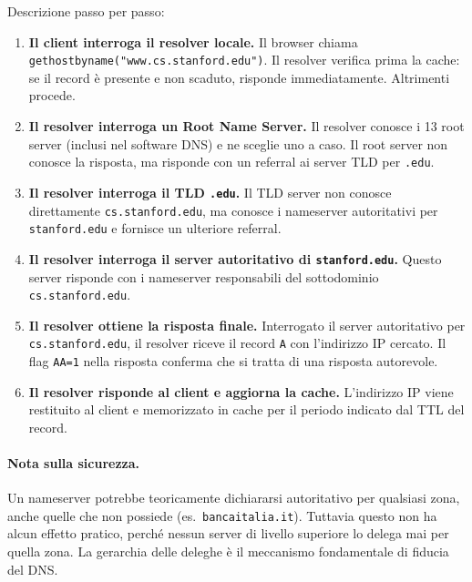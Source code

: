 \documentclass{article}
\begin{document}
Descrizione passo per passo:

\begin{enumerate}[label=\Circled{\arabic*}]
    \item \textbf{Il client interroga il resolver locale.} Il browser chiama
        \texttt{gethostbyname("www.cs.stanford.edu")}. Il resolver verifica
        prima la cache: se il record è presente e non scaduto, risponde
        immediatamente. Altrimenti procede.

    \item \textbf{Il resolver interroga un Root Name Server.} Il resolver
        conosce i 13 root server (inclusi nel software DNS) e ne sceglie uno
        a caso. Il root server non conosce la risposta, ma risponde con un
        referral ai server TLD per \texttt{.edu}.

    \item \textbf{Il resolver interroga il TLD \texttt{.edu}.} Il TLD server
        non conosce direttamente \texttt{cs.stanford.edu}, ma conosce i
        nameserver autoritativi per \texttt{stanford.edu} e fornisce un
        ulteriore referral.

    \item \textbf{Il resolver interroga il server autoritativo di
        \texttt{stanford.edu}.} Questo server risponde con i nameserver
        responsabili del sottodominio \texttt{cs.stanford.edu}.

    \item \textbf{Il resolver ottiene la risposta finale.} Interrogato il
        server autoritativo per \texttt{cs.stanford.edu}, il resolver riceve
        il record \texttt{A} con l'indirizzo IP cercato. Il flag \texttt{AA=1}
        nella risposta conferma che si tratta di una risposta autorevole.

    \item \textbf{Il resolver risponde al client e aggiorna la cache.}
        L'indirizzo IP viene restituito al client e memorizzato in cache per
        il periodo indicato dal TTL del record.
\end{enumerate}

\paragraph*{Nota sulla sicurezza.}
Un nameserver potrebbe teoricamente dichiararsi autoritativo per qualsiasi
zona, anche quelle che non possiede (es.\ \texttt{bancaitalia.it}). Tuttavia
questo non ha alcun effetto pratico, perché nessun server di livello superiore
lo delega mai per quella zona. La gerarchia delle deleghe è il meccanismo
fondamentale di fiducia del DNS.
\end{document}
